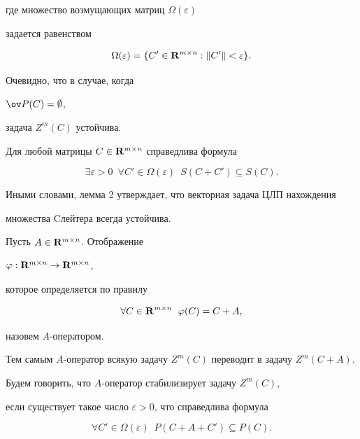 где множество возмущающих матриц $\Omega(\varepsilon)$


задается равенством


$$


\Omega(\varepsilon) = \{C'\in {\bold R}^{m\times n}:


\| C' \| < \varepsilon\}.


$$


Очевидно, что в случае, когда


$\ov P(C)=\emptyset$,


задача $Z^m(C)$ устойчива.





\begin{lem}


Для любой матрицы $C\in {\bold R}^{m\times n}$ справедлива формула


$$


\exists \varepsilon>0\ \; \forall C' \in


\Omega(\varepsilon)\ \; S(C+C') \subseteq S(C).


$$


\end{lem}





Иными словами, лемма 2 утверждает, что векторная задача ЦЛП нахождения


множества Cлейтера всегда устойчива.





Пусть $A\in {\bold R}^{m\times n}$. Отображение


$\varphi: {\bold R}^{m\times n}\to {\bold R}^{m\times n}$,


которое определяется по правилу


$$


\forall C\in {\bold R}^{m\times n}\ \; \varphi(C)=C+A,


$$


назовем $A$-оператором.


Тем самым $A$-оператор всякую задачу $Z^m(C)$ переводит в задачу $Z^m(C+A)$.


Будем говорить, что $A$-оператор стабилизирует задачу $Z^m(C)$,


если существует такое число $\varepsilon>0$, что справедлива формула


\begin{equation}


\forall C' \in \Omega(\varepsilon)\ \; P(C +A+C') \subseteq P(C).


\end{equation}


